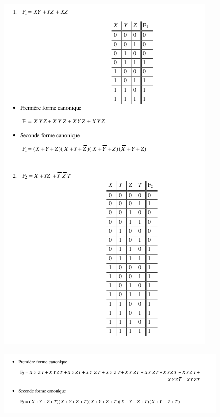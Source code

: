 \documentclass[a4paper,11pt]{article}
\begin{document}
  \begin{figure}[!h]
  \begin{center}
  \includegraphics[scale=0.8]{./te1-douillar-1.png}
  \end{center}
  \end{figure}

  \begin{figure}[!h]
  \begin{center}
  \includegraphics[scale=0.5]{./te1-douillar-2.png}
  \end{center}
  \end{figure}
\end{document}
